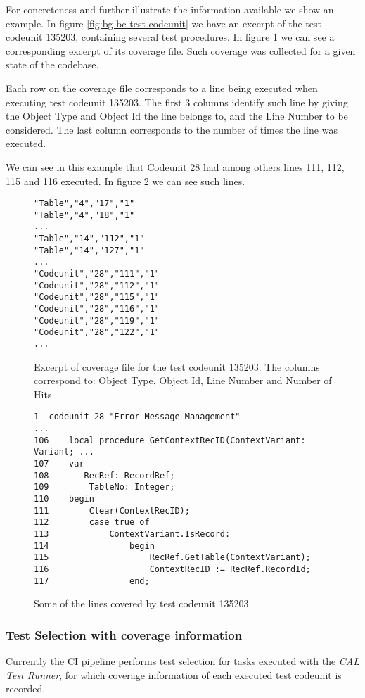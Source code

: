 For concreteness and further illustrate the information available we show an example. In figure \ref{fig:bg-bc-test-codeunit}
we have an excerpt of the test codeunit 135203, containing several test procedures. In figure \ref{fig:bg-bc-coveragefile} we can see
a corresponding excerpt of its coverage file. Such coverage was collected for a given state of the codebase.

Each row on the coverage file corresponds to a line being executed when executing test codeunit 135203. The first 3 columns 
identify such line by giving the Object Type and Object Id the line belongs to, and the Line Number to be considered. The last
column corresponds to the number of times the line was executed. 

We can see in this example that Codeunit 28 had among others lines 111, 112, 115 and 116  executed. In 
figure \ref{fig:bg-bc-covered-file} we can see such lines.

\begin{figure}
    \begin{Verbatim}[fontsize=\small]
"Table","4","17","1"
"Table","4","18","1"
...
"Table","14","112","1"
"Table","14","127","1"
...
"Codeunit","28","111","1"
"Codeunit","28","112","1"
"Codeunit","28","115","1"
"Codeunit","28","116","1"
"Codeunit","28","119","1"
"Codeunit","28","122","1"
...
    \end{Verbatim}
    \caption{Excerpt of coverage file for the test codeunit 135203. The columns correspond to: Object Type, Object Id, Line Number and Number of Hits}
    \label{fig:bg-bc-coveragefile}
\end{figure}

\begin{figure}
    \begin{Verbatim}[fontsize=\small]
1  codeunit 28 "Error Message Management"
...
106    local procedure GetContextRecID(ContextVariant: Variant; ...
107    var
108       RecRef: RecordRef;
109        TableNo: Integer;
110    begin
111        Clear(ContextRecID);
112        case true of
113            ContextVariant.IsRecord:
114                begin
115                    RecRef.GetTable(ContextVariant);
116                    ContextRecID := RecRef.RecordId;
117                end;
    \end{Verbatim}
    \caption{Some of the lines covered by test codeunit 135203.}
    \label{fig:bg-bc-covered-file}
\end{figure}

\subsubsection{Test Selection with coverage information}
Currently the CI pipeline performs test selection for tasks executed with the \emph{CAL Test Runner},
for which coverage information of each executed test codeunit is recorded.

